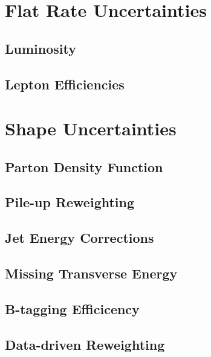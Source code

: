 \section{Flat Rate Uncertainties} \label{sec-FlateRateUncertainties}

\subsection{Luminosity} \label{subsec-Luminosity}

\subsection{Lepton Efficiencies} \label{subsec-LeptonEfficiencie}


\section{Shape Uncertainties} \label{sec-ShapeUncertainties}

\subsection{Parton Density Function} \label{subsec-PDFUncertainties}

\subsection{Pile-up Reweighting} \label{subsec-PUReweightingUncertainties}

\subsection{Jet Energy Corrections} \label{subsec-JECUncertainty}

\subsection{Missing Transverse Energy} \label{subsec-METUncertainty}

\subsection{B-tagging Efficicency} \label{subsec-BTagEfficiency}

\subsection{Data-driven Reweighting} \label{subsec-DataDriverReweightingUncertainties}

